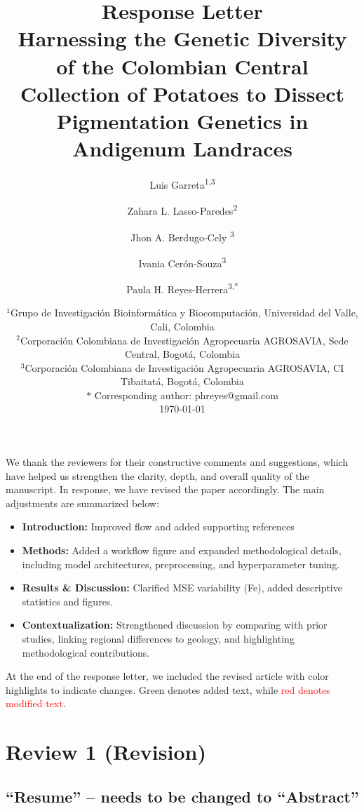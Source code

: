 \documentclass{article}
\title{\textbf{Response Letter}\\ Harnessing the Genetic Diversity of the Colombian Central Collection of Potatoes to Dissect Pigmentation Genetics in Andigenum Landraces}
\author{Luis Garreta\textsuperscript{1,3} \and Zahara L. Lasso-Paredes\textsuperscript{2} \and Jhon A. Berdugo-Cely \textsuperscript{3} \and Ivania Cerón-Souza\textsuperscript{3} \and Paula H. Reyes-Herrera\textsuperscript{3,*} }
\date{
  $^{1}$Grupo de Investigación Bioinformática y Biocomputación, Universidad del Valle, Cali, Colombia \\
  $^{2}$Corporación Colombiana de Investigación Agropecuaria AGROSAVIA, Sede Central,  Bogotá, Colombia \\
  $^{3}$Corporación Colombiana de Investigación Agropecuaria AGROSAVIA, CI Tibaitatá,  Bogotá, Colombia \\
  $*$ Corresponding author: phreyes@gmail.com\\
  \today
}
\begin{document}
\maketitle

We thank the reviewers for their constructive comments and suggestions, which have helped us strengthen the clarity, depth, and overall quality of the manuscript. In response, we have revised the paper accordingly. The main adjustments are summarized below:

\begin{itemize}
  \item \textbf{Introduction:} Improved flow and added supporting references
  \item \textbf{Methods:} Added a workflow figure and expanded methodological details, including model architectures, preprocessing, and hyperparameter tuning.
  \item \textbf{Results \& Discussion:} Clarified MSE variability (Fe), added descriptive statistics and figures.
  \item \textbf{Contextualization:} Strengthened discussion by comparing with prior studies, linking regional differences to geology, and highlighting methodological contributions.
\end{itemize}


At the end of the response letter, we included the revised article with color highlights to indicate changes. \textcolor{green!50!black}{Green denotes added text}, while \textcolor{red}{red denotes modified text}.

\section{Review 1 (Revision)}

   

\subsection{“Resume” – needs to be changed to “Abstract”}
\end{document}
